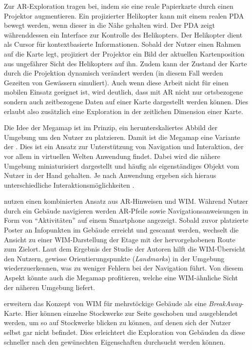 Zur \gls{AR}-Exploration tragen \textcite{Reitmayr2005} bei, indem sie eine reale Papierkarte durch einen Projektor augmentieren.
Ein projizierter Helikopter kann mit einem realen \gls{PDA} bewegt werden, wenn dieser in die Nähe gehalten wird.
Der \gls{PDA} zeigt währenddessen ein Interface zur Kontrolle des Helikopters.
Der Helikopter dient als Cursor für kontextbasierte Informationen.
Sobald der Nutzer einen Rahmen auf die Karte legt, projiziert der Projektor ein Bild der aktuellen Kartenposition aus ungefährer Sicht des Helikopters auf ihn.
Zudem kann der Zustand der Karte durch die Projektion dynamisch verändert werden (in diesem Fall werden Gezeiten von Gewässern simuliert).
Auch wenn diese Arbeit nicht für einen mobilen Einsatz geeignet ist, wird deutlich, dass mit \gls{AR} nicht nur ortsbezogene sondern auch zeitbezogene Daten auf einer Karte dargestellt werden können.
Dies erlaubt also zusätzlich eine Exploration in der zeitlichen Dimension einer Karte.

Die Idee der Megamap ist im Prinzip, ein herunterskaliertes Abbild der Umgebung um den Nutzer zu platzieren.
Damit ist die Megamap eine Variante der .
Dies ist ein Ansatz zur Unterstützung von Navigation und Interaktion, der vor allem in virtuellen Welten Anwendung findet.
Dabei wird die nähere Umgebung miniaturisiert dargestellt und häufig als eigenständiges Objekt vom Nutzer in der Hand gehalten.
Je nach Anwendung ergeben sich hieraus unterschiedliche Interaktionsmöglichkeiten \parencite{Stoakley1995}.

\textcites{Mulloni2011a}{Mulloni2012} nutzen einen kombinierten Ansatz aus \gls{AR}-Hinweisen und \gls{WIM}.
Während Nutzer durch ein Gebäude navigieren werden \gls{AR}-Pfeile sowie Navigationsanweisungen in Form von \enquote{Aktivitäten} auf einem Smartphone angezeigt.
Sobald zuvor platzierte Poster an Infopunkten im Gebäude erreicht und gescannt werden, wechselt die Ansicht zu einer \gls{WIM}-Darstellung der Etage mit der hervorgehobenen Route zum Zielort.
Laut dem Ergebnis der Studie der Autoren hilft die \gls{WIM}-Übersicht den Nutzern, gewisse Orientierungspunkte (\emph{Landmarks}) in der Umgebung wiederzuerkennen, was zu weniger Fehlern bei der Navigation führt.
Von diesem Aspekt könnte auch die Megamap profitieren, welche eine \gls{WIM}-ähnliche Sicht der näheren Umgebung liefert.

\textcite{Chittaro2005} erweitern das Konzept von \gls{WIM} für mehrstöckige Gebäude als eine \emph{BreakAway}-Karte.
Hier können einzelne Stockwerke zur Seite geschoben und ausgeblendet werden, um so auf Stockwerke blicken zu können, auf denen sich der Nutzer selbst gar nicht befindet.
Dies erleichtert die Exploration von Gebäuden da diese schneller nach den gewünschten Eigenschaften durchsucht werden können.

